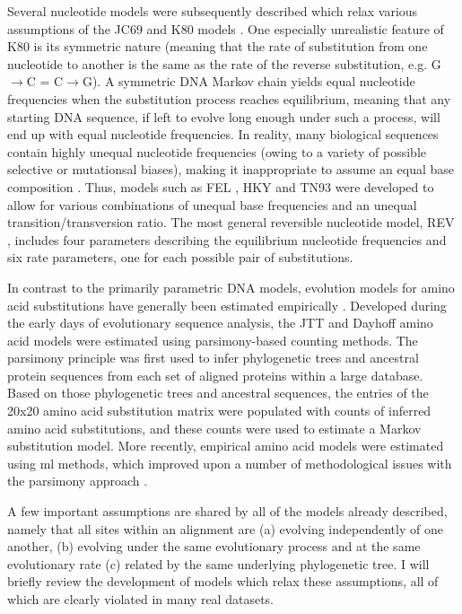 Several nucleotide models were subsequently described which relax
various assumptions of the JC69 and K80 models
\citet{Whelan2001,Yang2006}. One especially unrealistic feature of K80
is its symmetric nature (meaning that the rate of substitution from
one nucleotide to another is the same as the rate of the reverse
substitution, e.g. G$\to$C = C$\to$G). A symmetric DNA Markov chain
yields equal nucleotide frequencies when the substitution process
reaches equilibrium, meaning that any starting DNA sequence, if left
to evolve long enough under such a process, will end up with equal
nucleotide frequencies. In reality, many biological sequences contain
highly unequal nucleotide frequencies (owing to a variety of possible
selective or mutationsal biases), making it inappropriate to assume an
equal base composition \citep{Yang2006}. Thus, models such as FEL
\citep{Felsenstein1981a}, HKY \citep{Hasegawa1985} and TN93
\citep{Tamura1993} were developed to allow for various combinations of
unequal base frequencies and an unequal transition/transversion
ratio. The most general reversible nucleotide model, REV
\citep{Tavare1986}, includes four parameters describing the
equilibrium nucleotide frequencies and six rate parameters, one for
each possible pair of substitutions.

In contrast to the primarily parametric DNA models, evolution models
for amino acid substitutions have generally been estimated empirically
\citep{Whelan2001}. Developed during the early days of evolutionary
sequence analysis, the JTT \citep{Jones1992} and Dayhoff
\citep{Dayhoff1978} amino acid models were estimated using
parsimony-based counting methods. The parsimony principle was first
used to infer phylogenetic trees and ancestral protein sequences from
each set of aligned proteins within a large database. Based on those
phylogenetic trees and ancestral sequences, the entries of the 20x20
amino acid substitution matrix were populated with counts of inferred
amino acid substitutions, and these counts were used to estimate a
Markov substitution model. More recently, empirical amino acid models
were estimated using \ac{ml} methods, which improved upon a number of
methodological issues with the parsimony approach
\citep{Adachi1996,Whelan2001b}.

A few important assumptions are shared by all of the models already
described, namely that all sites within an alignment are (a) evolving
independently of one another, (b) evolving under the same evolutionary
process and at the same evolutionary rate (c) related by the same
underlying phylogenetic tree. I will briefly review the development of
models which relax these assumptions, all of which are clearly
violated in many real datasets.

